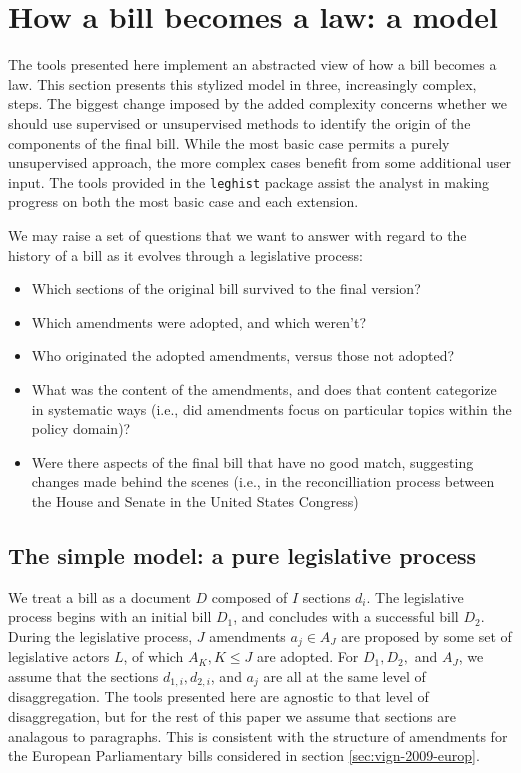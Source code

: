\documentclass[11pt]{article}
\begin{document}
\section{How a bill becomes a law: a model}
\label{sec:how-bill-becomes}

The tools presented here implement an abstracted view of how a bill
becomes a law. This section presents this stylized model in three,
increasingly complex, steps. The biggest change imposed by the added
complexity concerns whether we should use supervised or unsupervised
methods to identify the origin of the components of the final
bill. While the most basic case permits a purely unsupervised
approach, the more complex cases benefit from some additional user
input. The tools provided in the
\texttt{leghist} package assist the analyst in making progress on both
the most basic case and each extension. 

We may raise a set of questions that we want to answer with regard to
the history of a bill as it evolves through a legislative process:
\begin{itemize}
\item Which sections of the original bill survived to the final version?
\item Which amendments were adopted, and which weren't?
\item Who originated the adopted amendments, versus those not adopted?
\item What was the content of the amendments, and does that content
  categorize in systematic ways (i.e., did amendments focus on
  particular topics within the policy domain)?
\item Were there aspects of the final bill that have no good match,
  suggesting changes made behind the scenes (i.e., in the
  reconcilliation process between the House and Senate in the United States Congress)
\end{itemize}


\subsection{The simple model: a pure legislative process}
\label{sec:simple-model:-pure}

We treat a bill as a document $D$ composed of $I$ sections $d_i$. The
legislative process begins with an initial bill $D_1$, and concludes
with a successful bill $D_2$. During the legislative process, $J$
amendments $a_j \in A_J$ are
proposed by some set of legislative actors $L$, of which $A_K, K \leq
J$ are adopted. For $D_1, D_2,$ and $A_J$, we assume that the sections
$d_{1,i}, d_{2,i}$, and $a_j$ are all at the same level of
disaggregation. The tools presented here are agnostic to that level of
disaggregation, but for the rest of this paper we assume that sections
are analagous to paragraphs. This is consistent with the structure of
amendments for the European Parliamentary bills considered in section
\ref{sec:vign-2009-europ}.
\end{document}
